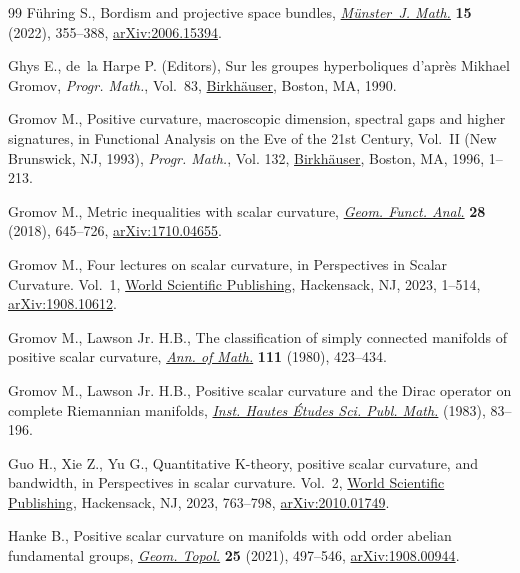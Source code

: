 \documentclass[10pt,a4paper]{amsart}
\numberwithin{equation}{section}
\begin{document}
\begin{thebibliography}{99}
F\"uhring S., Bordism and projective space bundles, \href{https://doi.org/10.17879/21089690084}{\textit{M\"unster~J. Math.}}
 \textbf{15} (2022), 355--388, \href{https://arxiv.org/abs/2006.15394}{arXiv:2006.15394}.

Ghys E., de~la Harpe P. (Editors), Sur les groupes hyperboliques d'apr\`es
 {M}ikhael {G}romov, \textit{Progr. Math.}, Vol.~83, \href{https://doi.org/10.1007/978-1-4684-9167-8}{Birkh\"auser}, Boston, MA,
 1990.

Gromov M., Positive curvature, macroscopic dimension, spectral gaps and higher
 signatures, in Functional {A}nalysis on the {E}ve of the 21st {C}entury,
 {V}ol.~{II} ({N}ew {B}runswick, {NJ}, 1993), \textit{Progr. Math.}, Vol. 132,
  \href{https://doi.org/10.1007/978-1-4612-4098-3_1}{Birkh\"auser}, Boston, MA, 1996, 1--213.

Gromov M., Metric inequalities with scalar curvature, \href{https://doi.org/10.1007/s00039-018-0453-z}{\textit{Geom. Funct.
 Anal.}} \textbf{28} (2018), 645--726, \href{https://arxiv.org/abs/1710.04655}{arXiv:1710.04655}.

Gromov M., Four lectures on scalar curvature, in Perspectives in {S}calar
 {C}urvature. {V}ol.~1, \href{https://doi.org/10.1142/97898112732230001}{World Scientific Publishing}, Hackensack, NJ, 2023,
 1--514, \href{https://arxiv.org/abs/1908.10612}{arXiv:1908.10612}.

Gromov M., Lawson Jr. H.B., The classification of simply connected manifolds of
 positive scalar curvature, \href{https://doi.org/10.2307/1971103}{\textit{Ann. of Math.}} \textbf{111} (1980),
 423--434.

Gromov M., Lawson Jr. H.B., Positive scalar curvature and the {D}irac operator
 on complete {R}iemannian manifolds, \href{https://doi.org/10.1007/BF02953774}{\textit{Inst. Hautes \'Etudes Sci. Publ.
 Math.}} (1983), 83--196.

Guo H., Xie Z., Yu G., Quantitative {K}-theory, positive scalar curvature, and
 bandwidth, in Perspectives in scalar curvature. {V}ol.~2, \href{https://doi.org/10.1142/12644-vol2}{World Scientific
 Publishing}, Hackensack, NJ, 2023, 763--798, \href{https://arxiv.org/abs/2010.01749}{arXiv:2010.01749}.

Hanke B., Positive scalar curvature on manifolds with odd order abelian
 fundamental groups, \href{https://doi.org/10.2140/gt.2021.25.497}{\textit{Geom. Topol.}} \textbf{25} (2021), 497--546,
 \href{https://arxiv.org/abs/1908.00944}{arXiv:1908.00944}.


\end{thebibliography}
\end{document}
